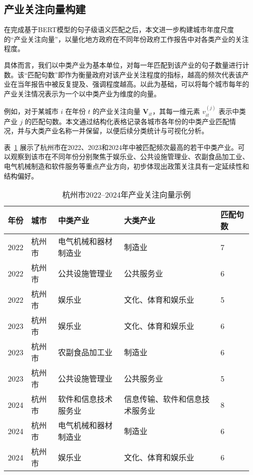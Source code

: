 \documentclass[a4paper,11pt, fontset=fandol]{ctexart}
\begin{document}
\subsection{产业关注向量构建}

在完成基于BERT模型的句子级语义匹配之后，本文进一步构建城市年度尺度的“产业关注向量”，以量化地方政府在不同年份政府工作报告中对各类产业的关注程度。

具体而言，我们以中类产业为基本单位，对每一年匹配到该产业的句子数量进行计数。该“匹配句数”即作为衡量政府对该产业关注程度的指标，越高的频次代表该产业在当年报告中被反复提及、强调程度越高。以此为基础，可以将每个城市每年的产业关注情况表示为一个以中类产业为维度的向量。

例如，对于某城市 $i$ 在年份 $t$ 的产业关注向量 $\mathbf{V}_{it}$，其每一维元素 $v_{it}^{(j)}$ 表示中类产业 $j$ 的匹配句数。本文通过结构化表格记录各城市各年份的中类产业匹配情况，并与大类产业名称一并保留，以便后续分类统计与可视化分析。

表~\ref{tab:industry_vector_example} 展示了杭州市在2022、2023和2024年中被匹配频次最高的若干中类产业。可以观察到该市在不同年份分别聚焦于娱乐业、公共设施管理业、农副食品加工业、电气机械制造和软件服务等重点产业方向，初步体现出政策关注具有一定延续性和结构偏好。


\vspace{0.5em}
\begin{table}[H]
\centering
\caption{杭州市2022--2024年产业关注向量示例}
\label{tab:industry_vector_example}
\begin{tabular}{p{1cm} p{1.5cm} p{4cm} p{5.5cm} p{2cm}}
\toprule
\textbf{年份} & \textbf{城市} & \textbf{中类产业} & \textbf{大类产业} & \textbf{匹配句数} \\
\midrule
2022 & 杭州市 & 电气机械和器材制造业 & 制造业 & 7 \\
2022 & 杭州市 & 公共设施管理业 & 公共服务业 & 6 \\
2022 & 杭州市 & 娱乐业 & 文化、体育和娱乐业 & 5 \\
\midrule
2023 & 杭州市 & 娱乐业 & 文化、体育和娱乐业 & 6 \\
2023 & 杭州市 & 农副食品加工业 & 制造业 & 6 \\
2023 & 杭州市 & 公共设施管理业 & 公共服务业 & 5 \\
\midrule
2024 & 杭州市 & 软件和信息技术服务业 & 信息传输、软件和信息技术服务业 & 8 \\
2024 & 杭州市 & 电气机械和器材制造业 & 制造业 & 6 \\
2024 & 杭州市 & 娱乐业 & 文化、体育和娱乐业 & 6 \\
\bottomrule
\end{tabular}
\end{table}
\end{document}
